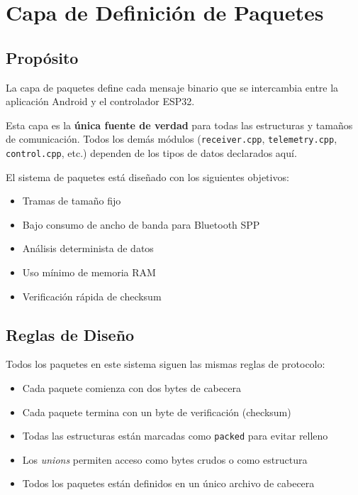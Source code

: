 \documentclass[12pt,a4paper]{article}
\newcommand{\ardfnDG}[1]{\texttt{\textcolor{arduinoTeal}{#1}}}
\begin{document}
\section{Capa de Definición de Paquetes}

\subsection{Propósito}

La capa de paquetes define cada mensaje binario que se intercambia entre la
aplicación Android y el controlador ESP32.

Esta capa es la \textbf{única fuente de verdad} para todas las estructuras y
tamaños de comunicación. Todos los demás módulos (\ardfnDG{receiver.cpp},
\ardfnDG{telemetry.cpp}, \ardfnDG{control.cpp}, etc.) dependen de los tipos de
datos declarados aquí.

El sistema de paquetes está diseñado con los siguientes objetivos:

\begin{itemize}
	\item Tramas de tamaño fijo
	\item Bajo consumo de ancho de banda para Bluetooth SPP
	\item Análisis determinista de datos
	\item Uso mínimo de memoria RAM
	\item Verificación rápida de checksum
\end{itemize}

\subsection{Reglas de Diseño}

Todos los paquetes en este sistema siguen las mismas reglas de protocolo:

\begin{itemize}
	\item Cada paquete comienza con dos bytes de cabecera
	\item Cada paquete termina con un byte de verificación (checksum)
	\item Todas las estructuras están marcadas como \texttt{packed} para evitar relleno
	\item Los \textit{unions} permiten acceso como bytes crudos o como estructura
	\item Todos los paquetes están definidos en un único archivo de cabecera
\end{itemize}
\end{document}
